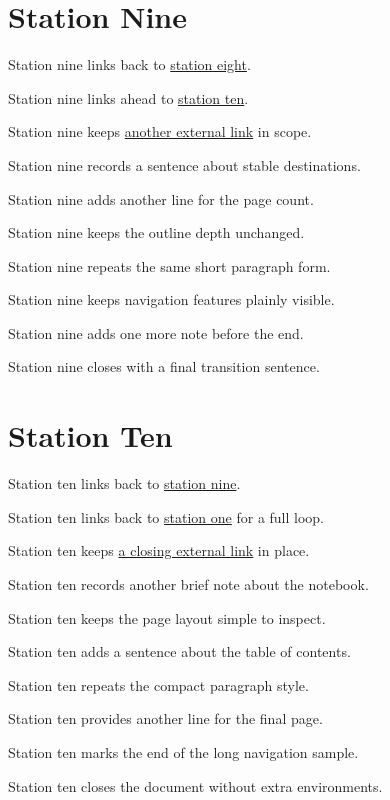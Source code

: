 \documentclass{article}
\begin{document}
\section{Station Nine}
\label{sec:station-nine}
Station nine links back to \hyperref[sec:station-eight]{station eight}.\par
Station nine links ahead to \hyperref[sec:station-ten]{station ten}.\par
Station nine keeps \href{https://example.com/nine}{another external link} in scope.\par
Station nine records a sentence about stable destinations.\par
Station nine adds another line for the page count.\par
Station nine keeps the outline depth unchanged.\par
Station nine repeats the same short paragraph form.\par
Station nine keeps navigation features plainly visible.\par
Station nine adds one more note before the end.\par
Station nine closes with a final transition sentence.\par
\newpage

\section{Station Ten}
\label{sec:station-ten}
Station ten links back to \hyperref[sec:station-nine]{station nine}.\par
Station ten links back to \hyperref[sec:station-one]{station one} for a full loop.\par
Station ten keeps \href{https://example.com/ten}{a closing external link} in place.\par
Station ten records another brief note about the notebook.\par
Station ten keeps the page layout simple to inspect.\par
Station ten adds a sentence about the table of contents.\par
Station ten repeats the compact paragraph style.\par
Station ten provides another line for the final page.\par
Station ten marks the end of the long navigation sample.\par
Station ten closes the document without extra environments.\par
\end{document}
